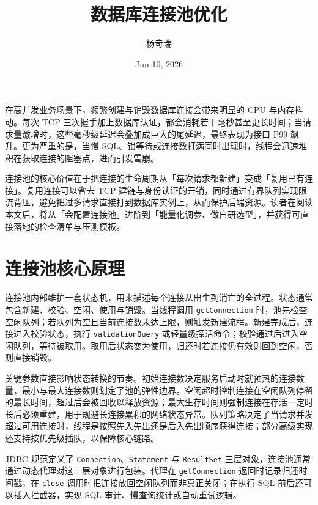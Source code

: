 \title{数据库连接池优化}
\author{杨岢瑞}
\date{Jun 10, 2026}
\maketitle
在高并发业务场景下，频繁创建与销毁数据库连接会带来明显的 CPU 与内存抖动。每次 TCP 三次握手加上数据库认证，都会消耗若干毫秒甚至更长时间；当请求量激增时，这些毫秒级延迟会叠加成巨大的尾延迟，最终表现为接口 P99 飙升。更为严重的是，当慢 SQL、锁等待或连接数打满同时出现时，线程会迅速堆积在获取连接的阻塞点，进而引发雪崩。\par
连接池的核心价值在于把连接的生命周期从「每次请求都新建」变成「复用已有连接」。复用连接可以省去 TCP 建链与身份认证的开销，同时通过有界队列实现限流背压，避免把过多请求直接打到数据库实例上，从而保护后端资源。读者在阅读本文后，将从「会配置连接池」进阶到「能量化调参、做自研选型」，并获得可直接落地的检查清单与压测模板。\par
\chapter{连接池核心原理}
连接池内部维护一套状态机，用来描述每个连接从出生到消亡的全过程。状态通常包含新建、校验、空闲、使用与销毁。当线程调用 \texttt{getConnection} 时，池先检查空闲队列；若队列为空且当前连接数未达上限，则触发新建流程。新建完成后，连接进入校验状态，执行 \texttt{validationQuery} 或轻量级探活命令；校验通过后进入空闲队列，等待被取用。取用后状态变为使用，归还时若连接仍有效则回到空闲，否则直接销毁。\par
关键参数直接影响状态转换的节奏。初始连接数决定服务启动时就预热的连接数量，最小与最大连接数则划定了池的弹性边界。空闲超时控制连接在空闲队列停留的最长时间，超过后会被回收以释放资源；最大生存时间则强制连接在存活一定时长后必须重建，用于规避长连接累积的网络状态异常。队列策略决定了当请求并发超过可用连接时，线程是按照先入先出还是后入先出顺序获得连接；部分高级实现还支持按优先级插队，以保障核心链路。\par
JDBC 规范定义了 \texttt{Connection}、\texttt{Statement} 与 \texttt{ResultSet} 三层对象，连接池通常通过动态代理对这三层对象进行包装。代理在 \texttt{getConnection} 返回时记录归还时间戳，在 \texttt{close} 调用时把连接放回空闲队列而非真正关闭；在执行 SQL 前后还可以插入拦截器，实现 SQL 审计、慢查询统计或自动重试逻辑。\par
